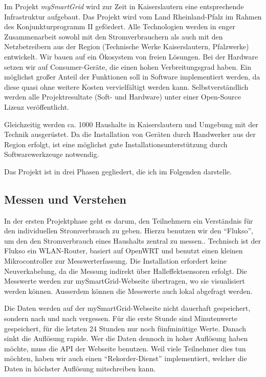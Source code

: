\documentclass[12pt,BCOR=8.5mm]{scrartcl}
\begin{document}
Im Projekt \emph{mySmartGrid} wird zur Zeit in Kaiserslautern eine
entsprechende Infrastruktur aufgebaut. Das Projekt wird vom Land
Rheinland-Pfalz im Rahmen des Konjunkturprogramm II gefördert. Alle
Technologien werden in enger Zusammenarbeit sowohl mit den
Stromverbrauchern als auch mit den Netzbetreibern aus der Region
(Technische Werke Kaiserslautern, Pfalzwerke) entwickelt.  Wir bauen auf
ein Ökosystem von freien Lösungen.  Bei der Hardware setzen wir auf
Consumer-Geräte, die einen hohen Verbreitungsgrad haben.  Ein möglichst
großer Anteil der Funktionen soll in Software implementiert werden, da
diese quasi ohne weitere Kosten vervielfältigt werden kann.
Selbstverständlich werden alle Projektresultate (Soft- und Hardware)
unter einer Open-Source Lizenz veröffentlicht. 

Gleichzeitig werden ca.  1000 Haushalte in Kaiserslautern und Umgebung
mit der Technik ausgerüstet. Da die Installation von Geräten durch
Handwerker aus der Region erfolgt, ist eine möglichst gute
Installationsunterstützung durch Softwarewerkzeuge notwendig.

Das Projekt ist in drei Phasen gegliedert, die ich im Folgenden
darstelle.

\subsection{Messen und Verstehen}\label{sub:messenverstehen}

In der ersten Projektphase geht es darum, den Teilnehmern ein
Verständnis für den individuellen Stromverbrauch zu geben. Hierzu
benutzen wir den "`Flukso"', um den den Stromverbrauch eines Haushalts
zentral zu messen.. Technisch ist der
Flukso ein WLAN-Router, basiert auf OpenWRT und benutzt einen kleinen
Mikrocontroller zur Messwerterfassung. Die Installation erfordert keine
Neuverkabelung, da die Messung indirekt über Halleffektsensoren erfolgt.
Die Messwerte werden zur mySmartGrid-Webseite übertragen, wo sie
visualisiert werden können. Ausserdem können die Messwerte auch lokal
abgefragt werden.

Die Daten werden auf der mySmartGrid-Webseite nicht dauerhaft
gespeichert, sondern nach und nach vergessen. Für die erste Stunde sind
Minutenwerte gespeichert, für die letzten 24 Stunden nur noch
fünfminütige Werte. Danach sinkt die Auflösung rapide. Wer die Daten
dennoch in hoher Auflösung haben möchte, muss die API der Webseite
benutzen. Weil viele Teilnehmer dies tun möchten, haben wir auch einen
"`Rekorder-Dienst"' implementiert, welcher die Daten in höchster
Auflösung mitschreiben kann. 
\end{document}
